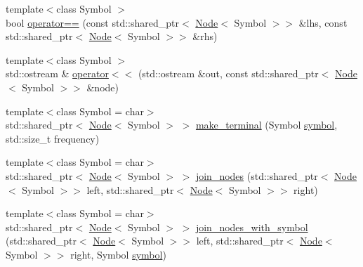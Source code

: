 \begin{DoxyCompactItemize}
\item 
{\footnotesize template$<$class Symbol $>$ }\\bool \mbox{\hyperlink{namespaceirkit_1_1coding_1_1huffman_a38c31c94fea7c10dc0ba13625b44a2b2}{operator==}} (const std\+::shared\+\_\+ptr$<$ \mbox{\hyperlink{structirkit_1_1coding_1_1huffman_1_1Node}{Node}}$<$ Symbol $>$$>$ \&lhs, const std\+::shared\+\_\+ptr$<$ \mbox{\hyperlink{structirkit_1_1coding_1_1huffman_1_1Node}{Node}}$<$ Symbol $>$$>$ \&rhs)
\item 
{\footnotesize template$<$class Symbol $>$ }\\std\+::ostream \& \mbox{\hyperlink{namespaceirkit_1_1coding_1_1huffman_aaee845163a3d96e6dab75655f5a7dce4}{operator$<$$<$}} (std\+::ostream \&out, const std\+::shared\+\_\+ptr$<$ \mbox{\hyperlink{structirkit_1_1coding_1_1huffman_1_1Node}{Node}}$<$ Symbol $>$$>$ \&node)
\item 
{\footnotesize template$<$class Symbol  = char$>$ }\\std\+::shared\+\_\+ptr$<$ \mbox{\hyperlink{structirkit_1_1coding_1_1huffman_1_1Node}{Node}}$<$ Symbol $>$ $>$ \mbox{\hyperlink{namespaceirkit_1_1coding_1_1huffman_a33c76a9acb32650215d101ee1d39918f}{make\+\_\+terminal}} (Symbol \mbox{\hyperlink{porter2_8hpp_a04438e24473719aaf288c57833717164}{symbol}}, std\+::size\+\_\+t frequency)
\item 
{\footnotesize template$<$class Symbol  = char$>$ }\\std\+::shared\+\_\+ptr$<$ \mbox{\hyperlink{structirkit_1_1coding_1_1huffman_1_1Node}{Node}}$<$ Symbol $>$ $>$ \mbox{\hyperlink{namespaceirkit_1_1coding_1_1huffman_a80bc59947120a14857cf6b6344ad098d}{join\+\_\+nodes}} (std\+::shared\+\_\+ptr$<$ \mbox{\hyperlink{structirkit_1_1coding_1_1huffman_1_1Node}{Node}}$<$ Symbol $>$$>$ left, std\+::shared\+\_\+ptr$<$ \mbox{\hyperlink{structirkit_1_1coding_1_1huffman_1_1Node}{Node}}$<$ Symbol $>$$>$ right)
\item 
{\footnotesize template$<$class Symbol  = char$>$ }\\std\+::shared\+\_\+ptr$<$ \mbox{\hyperlink{structirkit_1_1coding_1_1huffman_1_1Node}{Node}}$<$ Symbol $>$ $>$ \mbox{\hyperlink{namespaceirkit_1_1coding_1_1huffman_abf6495ba74b7d8d41655b97400a3018a}{join\+\_\+nodes\+\_\+with\+\_\+symbol}} (std\+::shared\+\_\+ptr$<$ \mbox{\hyperlink{structirkit_1_1coding_1_1huffman_1_1Node}{Node}}$<$ Symbol $>$$>$ left, std\+::shared\+\_\+ptr$<$ \mbox{\hyperlink{structirkit_1_1coding_1_1huffman_1_1Node}{Node}}$<$ Symbol $>$$>$ right, Symbol \mbox{\hyperlink{porter2_8hpp_a04438e24473719aaf288c57833717164}{symbol}})
$$
\end{DoxyCompactItemize}
